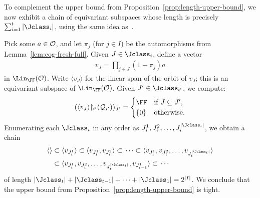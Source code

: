 To complement the upper bound from Proposition~\ref{prop:length-upper-bound}, we now exhibit a chain of equivariant subspaces whose length is precisely $\sum_{i=1}^t |\Jclass_i|$, using the same idea as~\cite[Cor.~4.12]{BFKM24}.

Pick some $a\in \cal O$, and let $\pi_j$ (for $j \in I$) be the automorphisms from Lemma~\ref{lem:cog-fresh-full}.
Given $J \in \Jclass_i$, define a vector
\begin{align*}
    v_{J} =  \prod_{j \in J} (1 - \pi_j) a
\end{align*}
in $\Lin_\FF(\cal O)$. 
Write $\langle v_J \rangle$ for the linear span of the orbit of $v_J$; this is an equivariant subspace of $\Lin_\FF(\cal O)$.
Given $J' \in \Jclass_{i'}$, we compute:
\[
    (\langle v_{J} \rangle {\restriction_{i'}} (\mathcal{Q}_{i'}))_{J'} =
    \begin{cases}
        \FF & \text{if $J \subseteq J'$}, \\
        \{0\} & \text{otherwise}.
    \end{cases}
\]
Enumerating each $\Jclass_i$ in any order as $J_i^1, J_i^2, \dots, J_i^{|\Jclass_i|}$,
we obtain a chain
\begin{align*}
    \langle  \rangle 
    & \subset{} \langle v_{J_t^1} \rangle 
    \subset{} \langle v_{J_t^1}, v_{J_t^2} \rangle  
    \subset{} \cdots 
    \subset{} \langle v_{J_t^1}, v_{J_t^2}, \dots, v_{J_t^{|\Jclass_t|}} \rangle \\
   & \subset{} \langle v_{J_t^1}, v_{J_t^2}, \dots, v_{J_t^{|\Jclass_t|}}, v_{J_{t-1}^1} \rangle 
     \subset{} \cdots
\end{align*}
of length $|\Jclass_t| + |\Jclass_{t-1}| + \cdots + |\Jclass_1| = 2^{|I|}$.
We conclude that the upper bound from Proposition~\ref{prop:length-upper-bound} is tight.

